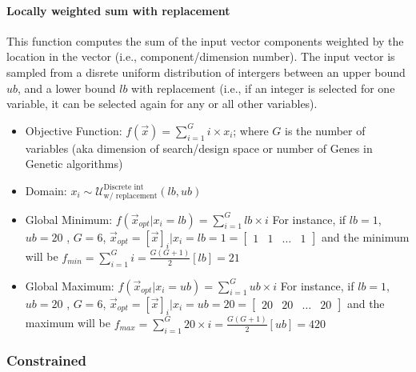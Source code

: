 \paragraph{Locally weighted sum with replacement}
This function computes the sum of the input vector components weighted by the location in the vector (i.e., component/dimension number). The input vector is sampled from a disrete uniform distribution of intergers between an upper bound $ub$, and a lower bound $lb$ with replacement (i.e., if an integer is selected for one variable, it can be selected again for any or all other variables).
\begin{itemize}
	\item Objective Function: $f(\vec{x}) = \sum_{i=1}^{G}i \times x_i$; where $G$ is the number of variables (aka dimension of search/design space or number of Genes in Genetic algorithms) 
	\item Domain: $x_i \sim \mathcal{U}^{\text{Discrete int}}_{\text{w/ replacement}} (lb,ub)$
	\item Global Minimum: $f(\vec{x}_{opt}|x_i = lb) = \sum_{i=1}^{G} lb \times i$
	For instance, if $lb =1$, $ub=20$ , $G=6$, $\vec{x}_{opt} = [\vec{x}]_i | x_i = lb = 1 = \begin{bmatrix}
	1 & 1 & \dots & 1 \end{bmatrix}$ and the minimum will be $f_{min} = \sum_{i=1}^{G} i = \frac{G(G+1)}{2}[lb] = 21$
	\item Global Maximum: $f(\vec{x}_{opt}|x_i = ub) = \sum_{i=1}^{G} ub \times i$
	For instance, if $lb =1$, $ub=20$ , $G=6$, $\vec{x}_{opt} = [\vec{x}]_i | x_i = ub = 20 = \begin{bmatrix}
	20 & 20 & \dots & 20 \end{bmatrix}$ and the maximum will be $f_{max} = \sum_{i=1}^{G} 20 \times i = \frac{G(G+1)}{2}[ub] = 420$
\end{itemize}

\subsubsection{Constrained}
